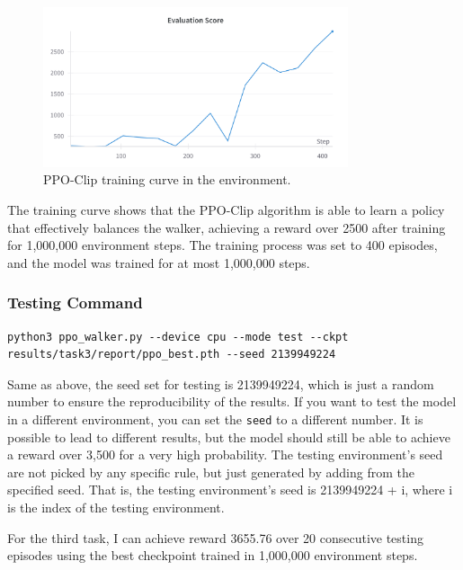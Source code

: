 \begin{figure}[H]
    \centering
    \includegraphics[width=0.8\textwidth]{figures/task3.png}
    \caption{PPO-Clip training curve in the \walker environment.}
    \label{fig:task3}
\end{figure}
The training curve shows that the PPO-Clip algorithm is able to learn a policy that effectively balances the walker, achieving a reward over 2500 after training for 1,000,000 environment steps.
The training process was set to 400 episodes, and the model was trained for at most 1,000,000 steps.

\subsubsection{Testing Command}

\begin{verbatim}
python3 ppo_walker.py --device cpu --mode test --ckpt results/task3/report/ppo_best.pth --seed 2139949224
\end{verbatim}

Same as above, the seed set for testing is 2139949224, which is just a random number to ensure the reproducibility of the results.
If you want to test the model in a different environment, you can set the \texttt{seed} to a different number.
It is possible to lead to different results, but the model should still be able to achieve a reward over 3,500 for a very high probability.
The testing environment's seed are not picked by any specific rule, but just generated by adding from the specified seed.
That is, the testing environment's seed is 2139949224 + i, where i is the index of the testing environment.

For the third task, I can achieve reward 3655.76 over 20 consecutive testing episodes using the best checkpoint trained in 1,000,000 environment steps.
